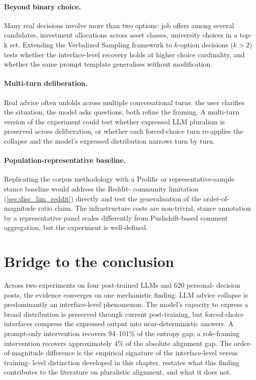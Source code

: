 \paragraph{Beyond binary choice.} Many real decisions involve more
than two options: job offers among several candidates, investment
allocations across asset classes, university choices in a top-k set.
Extending the Verbalized Sampling framework to $k$-option decisions
($k > 2$) tests whether the interface-level recovery holds at higher
choice cardinality, and whether the same prompt template generalises
without modification.

\paragraph{Multi-turn deliberation.} Real advice often unfolds across
multiple conversational turns: the user clarifies the situation, the
model asks questions, both refine the framing. A multi-turn version of
the experiment could test whether expressed LLM pluralism is preserved
across deliberation, or whether each forced-choice turn re-applies the
collapse and the model's expressed distribution narrows turn by turn.

\paragraph{Population-representative baseline.}
\label{sec:disc_fw_population}
Replicating the corpus methodology with a Prolific or
representative-sample stance baseline would address the Reddit-
community limitation (\cref{sec:disc_lim_reddit}) directly and test
the generalisation of the order-of-magnitude ratio claim. The
infrastructure costs are non-trivial, stance annotation by a
representative panel scales differently from Pushshift-based comment
aggregation, but the experiment is well-defined.

\section{Bridge to the conclusion}
\label{sec:disc_bridge}

Across two experiments on four post-trained LLMs and 620 personal-
decision posts, the evidence converges on one mechanistic finding:
LLM advice collapse is predominantly an interface-level phenomenon.
The model's capacity to express a broad distribution is preserved
through current post-training, but forced-choice interfaces compress
the expressed output into near-deterministic answers. A prompt-only intervention recovers 94--101\%
of the entropy gap; a role-framing intervention recovers approximately
4\% of the absolute alignment gap. The order-of-magnitude difference
is the empirical signature of the interface-level versus training-
level distinction developed in this chapter.
 restates what this finding contributes to the
literature on pluralistic alignment, and what it does not.
